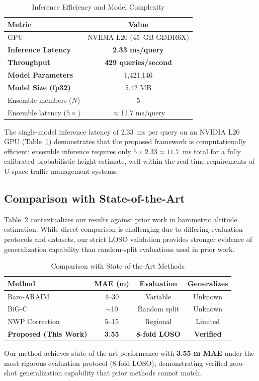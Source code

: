 \begin{table}[htbp]
\caption{Inference Efficiency and Model Complexity}
\label{tab:uncertainty}
\centering
\begin{tabular}{lc}
\toprule
\textbf{Metric} & \textbf{Value} \\
\midrule
GPU & NVIDIA L20 (45~GB GDDR6X) \\
\midrule
\textbf{Inference Latency} & \textbf{2.33 ms/query} \\
\textbf{Throughput} & \textbf{429 queries/second} \\
\textbf{Model Parameters} & 1,421,146 \\
\textbf{Model Size (fp32)} & 5.42 MB \\
\midrule
Ensemble members ($N$) & 5 \\
Ensemble latency ($5\times$) & $\approx$11.7 ms/query \\
\bottomrule
\end{tabular}
\end{table}

The single-model inference latency of 2.33~ms per query on an NVIDIA L20 GPU (Table~\ref{tab:uncertainty}) demonstrates that the proposed framework is computationally efficient: ensemble inference requires only $5 \times 2.33 \approx 11.7$~ms total for a fully calibrated probabilistic height estimate, well within the real-time requirements of U-space traffic management systems.

\subsection{Comparison with State-of-the-Art}

Table~\ref{tab:sota_comparison} contextualizes our results against prior work in barometric altitude estimation. While direct comparison is challenging due to differing evaluation protocols and datasets, our strict LOSO validation provides stronger evidence of generalization capability than random-split evaluations used in prior work.

\begin{table}[htbp]
\caption{Comparison with State-of-the-Art Methods}
\label{tab:sota_comparison}
\centering
\begin{tabular}{lccc}
\toprule
\textbf{Method} & \textbf{MAE (m)} & \textbf{Evaluation} & \textbf{Generalizes} \\
\midrule
Baro-ARAIM \cite{simonetti2024geodetic} & 4--30 & Variable & Unknown \\
BiG-C \cite{narayanan2022enhanced} & $\sim$10 & Random split & Unknown \\
NWP Correction \cite{schumann2017use} & 5--15 & Regional & Limited \\
\midrule
\textbf{Proposed (This Work)} & \textbf{3.55} & \textbf{8-fold LOSO} & \textbf{Verified} \\
\bottomrule
\end{tabular}
\end{table}

Our method achieves state-of-the-art performance with \textbf{3.55 m MAE} under the most rigorous evaluation protocol (8-fold LOSO), demonstrating verified zero-shot generalization capability that prior methods cannot match.
